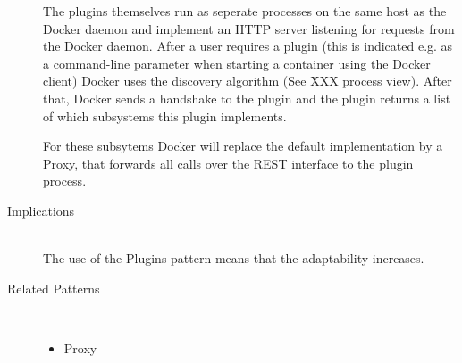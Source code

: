 \begin{description}
The plugins themselves run as seperate processes on the same host as the Docker daemon and implement an HTTP server listening for requests from the Docker daemon. After a user requires a plugin (this is indicated e.g. as a command-line parameter when starting a container using the Docker client) Docker uses the discovery algorithm (See XXX process view). After that, Docker sends a handshake to the plugin and the plugin returns a list of which subsystems this plugin implements.  %

For these subsytems Docker will replace the default implementation by a Proxy, that forwards all calls over the REST interface to the plugin process.

\item [Implications]~\\
The use of the Plugins pattern means that the adaptability increases. 

\item [Related Patterns]~
\begin{itemize}
\item Proxy
\end{itemize}

\end{description}

